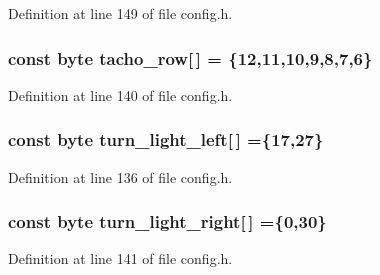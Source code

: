 Definition at line 149 of file config.\+h.

\subsubsection[{\texorpdfstring{tacho\+\_\+row}{tacho_row}}]{\setlength{\rightskip}{0pt plus 5cm}const byte tacho\+\_\+row\mbox{[}$\,$\mbox{]} = \{12,11,10,9,8,7,6\}}\hypertarget{group__deployment_ga6ade605406f4c1ce9f03a5a2530f6dbe}{}\label{group__deployment_ga6ade605406f4c1ce9f03a5a2530f6dbe}


Definition at line 140 of file config.\+h.

\subsubsection[{\texorpdfstring{turn\+\_\+light\+\_\+left}{turn_light_left}}]{\setlength{\rightskip}{0pt plus 5cm}const byte turn\+\_\+light\+\_\+left\mbox{[}$\,$\mbox{]} =\{17,27\}}\hypertarget{group__deployment_gac03fd0ab9cbcc53730039ad03e9b094d}{}\label{group__deployment_gac03fd0ab9cbcc53730039ad03e9b094d}


Definition at line 136 of file config.\+h.

\subsubsection[{\texorpdfstring{turn\+\_\+light\+\_\+right}{turn_light_right}}]{\setlength{\rightskip}{0pt plus 5cm}const byte turn\+\_\+light\+\_\+right\mbox{[}$\,$\mbox{]} =\{0,30\}}\hypertarget{group__deployment_gaa5a6ee27fdf1d7c939cdf2a7266d7e84}{}\label{group__deployment_gaa5a6ee27fdf1d7c939cdf2a7266d7e84}


Definition at line 141 of file config.\+h.

